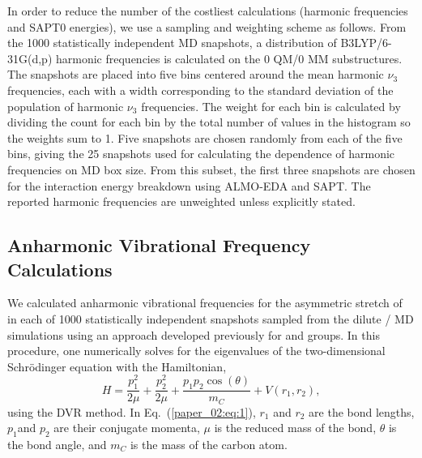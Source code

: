 In order to reduce the number of the costliest calculations (harmonic frequencies and SAPT0 energies), we use a sampling and weighting scheme as follows. From the \num{1000} statistically independent MD snapshots, a distribution of B3LYP/6-31G(d,p) harmonic frequencies is calculated on the 0 QM/0 MM substructures. The snapshots are placed into five bins centered around the mean harmonic \(\nu_{3}\) frequencies, each with a width corresponding to the standard deviation of the population of harmonic \(\nu_{3}\) frequencies. The weight for each bin is calculated by dividing the count for each bin by the total number of values in the histogram so the weights sum to \num{1}. Five snapshots are chosen randomly from each of the five bins, giving the \num{25} snapshots used for calculating the dependence of harmonic frequencies on MD box size. From this subset, the first three snapshots are chosen for the interaction energy breakdown using ALMO-EDA and SAPT. The reported harmonic frequencies are unweighted unless explicitly stated.

\subsection{Anharmonic Vibrational Frequency Calculations}
\label{paper_02:ssec:IIB}

We calculated anharmonic vibrational frequencies for the asymmetric stretch of  in each of \num{1000} statistically independent snapshots sampled from the dilute /\ce{[C4C1im][PF6]} MD simulations using an approach developed previously for  and  groups.\cite{levinson_phosphate_2011,Kinnaman2006} In this procedure, one numerically solves for the eigenvalues of the two-dimensional Schr{\"{o}}dinger equation with the Hamiltonian,
\begin{equation}
  \label{paper_02:eq:1}
H = \frac{p_{1}^{2}}{2\mu} + \frac{p_{2}^{2}}{2\mu} + \frac{p_{1}p_{2}\cos{(\theta)}}{m_{C}} + V\left( r_{1},r_{2} \right),
\end{equation}
using the DVR method.\cite{colbert_novel_1992,seideman_quantum_1992} In Eq.~(\ref{paper_02:eq:1}), \(r_{1}\) and \(r_{2}\) are the  bond lengths, \(p_{1}\)and \(p_{2}\) are their conjugate momenta, \(\mu\) is the reduced mass of the  bond, \(\theta\) is the  bond angle, and \(m_C\) is the mass of the carbon atom.

